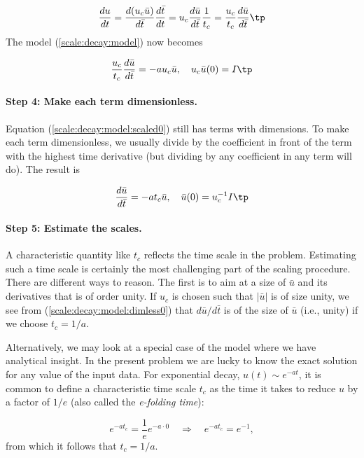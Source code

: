 \documentclass[graybox,envcountchap,sectrefs,final]{svmonodo}
\begin{document}
\[ \frac{du}{dt} = \frac{d (u_c\bar u)}{d\bar t}\frac{d\bar t}{dt}
= u_c\frac{d\bar u}{d\bar t}\frac{1}{t_c} =
\frac{u_c}{t_c}\frac{d\bar u}{d\bar t}\tp
\]
The model (\ref{scale:decay:model}) now becomes

\begin{equation}
\frac{u_c}{t_c}\frac{d\bar u}{d\bar t} = -au_c\bar u,\quad u_c\bar u(0)=I\tp
\label{scale:decay:model:scaled0}
\end{equation}

\paragraph{Step 4: Make each term dimensionless.}
Equation (\ref{scale:decay:model:scaled0}) still has terms with
dimensions. To make each term dimensionless, we usually divide by
the coefficient in front of the term with the highest time derivative
(but dividing by any coefficient in any term will do). The result is

\begin{equation}
\frac{d\bar u}{d\bar t} = -at_c\bar u,\quad \bar u(0)=u_c^{-1}I
\tp
\label{scale:decay:model:dimless0}
\end{equation}

\paragraph{Step 5: Estimate the scales.}
A characteristic quantity like $t_c$ reflects the time scale in the
problem. Estimating such a time scale is certainly
the most challenging part of the scaling procedure. There are different
ways to reason. The first is to aim at a size of $\bar u$ and its derivatives
that is of order unity. If $u_c$ is chosen such that $|\bar u|$ is
of size unity, we see from (\ref{scale:decay:model:dimless0}) that
$d\bar u/d\bar t$ is of the size of $\bar u$ (i.e., unity)
if we choose $t_c = 1/a$.


Alternatively, we may look at a special case of the model where we have
analytical insight. In the present problem we are lucky to know the
exact solution for any value of the input data. For exponential
decay, $u(t)\sim e^{-at}$, it is common to define a characteristic time
scale $t_c$ as the time it takes to reduce $u$ by a factor of $1/e$ (also
called the \emph{e-folding time}):

\[ e^{-at_c} = \frac{1}{e}e^{-a\cdot 0}\quad\Rightarrow\quad e^{-at_c}=e^{-1},
\]
from which it follows that $t_c = 1/a$.
\end{document}
